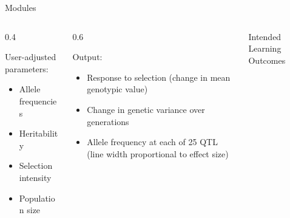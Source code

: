 \documentclass[final]{beamer}
\newlength{\onecolwid}
\newlength{\twocolwid}
\begin{document}
\begin{frame}[t]
\begin{columns}[t]
\begin{column}{\twocolwid}
\begin{block}{Modules}
\begin{columns}[t,totalwidth=\twocolwid]
\begin{column}{\onecolwid}
\begin{columns}[t,totalwidth=\onecolwid] %

\begin{column}{0.4\onecolwid} %

User-adjusted parameters:

\begin{itemize}
  \item Allele frequencies
  \item Heritability
  \item Selection intensity
  \item Population size
\end{itemize}

\end{column}
\begin{column}{0.6\onecolwid} %

Output:

\begin{itemize}
  \item Response to selection (change in mean genotypic value)
  \item Change in genetic variance over generations
  \item Allele frequency at each of 25 QTL (line width proportional to effect size)
\end{itemize}


\end{column}
\end{columns}


\end{column}






\begin{column}{\onecolwid}



\vspace{-0.5cm}

\begin{alertblock}{Intended Learning Outcomes}


\begin{center}
\begin{figure}
\end{figure}
\end{center}


\end{alertblock}
\end{column}
\end{columns}
\end{block}
\end{column}
\end{columns}
\end{frame}
\end{document}
